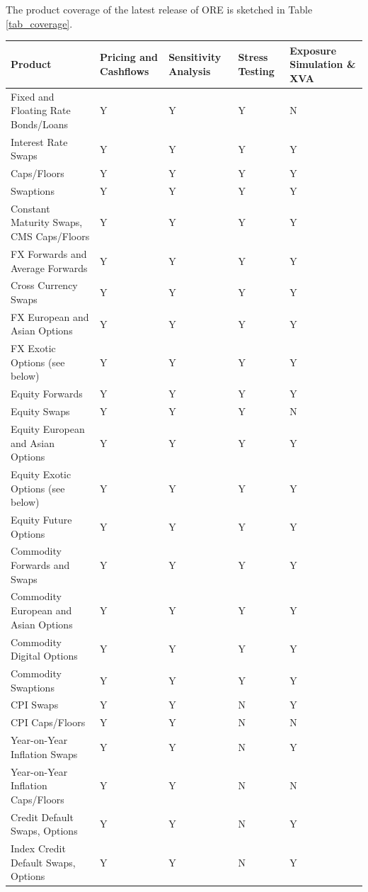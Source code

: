 \documentclass[12pt, a4paper]{article}
\begin{document}
\medskip 
The product coverage of the latest release of ORE is sketched in Table \ref{tab_coverage}.
\begin{table}[hbt]
\scriptsize
\begin{center}
\begin{tabular}{|l|p{1.5cm}|p{1.5cm}|p{1.2cm}|p{1.5cm}|}
\hline
Product & Pricing and Cashflows & Sensitivity Analysis & Stress Testing & Exposure Simulation \& XVA\\
\hline
Fixed and Floating Rate Bonds/Loans & Y & Y & Y & N \\
\hline
Interest Rate Swaps & Y & Y & Y & Y\\
\hline
Caps/Floors & Y & Y & Y & Y\\
\hline
Swaptions & Y & Y & Y &Y \\
\hline
Constant Maturity Swaps, CMS Caps/Floors & Y & Y & Y & Y\\
\hline
FX Forwards and Average Forwards & Y & Y & Y & Y \\
\hline
Cross Currency Swaps & Y & Y & Y & Y \\
\hline
FX European and Asian Options & Y & Y & Y & Y\\
\hline
FX Exotic Options (see below) & Y & Y & Y & Y\\
\hline
Equity Forwards & Y & Y & Y & Y\\
\hline
Equity Swaps & Y & Y & Y & N\\
\hline
Equity European and Asian Options & Y & Y & Y & Y \\
\hline
Equity Exotic Options (see below)  & Y & Y & Y & Y \\
\hline
Equity Future Options & Y & Y & Y & Y \\
\hline
Commodity Forwards and Swaps & Y & Y & Y & Y\\
\hline
Commodity European and Asian Options & Y & Y & Y & Y \\
\hline
Commodity Digital Options & Y & Y & Y & Y \\
\hline
Commodity Swaptions & Y & Y & Y & Y\\
\hline
CPI Swaps & Y & Y & N & Y \\
\hline
CPI Caps/Floors & Y & Y & N & N\\
\hline
Year-on-Year Inflation Swaps & Y & Y & N & Y \\
\hline
Year-on-Year Inflation Caps/Floors & Y & Y & N & N\\
\hline
Credit Default Swaps, Options & Y & Y & N & Y \\
\hline
Index Credit Default Swaps, Options & Y & Y & N & Y \\

\end{tabular}
\end{center}
\end{table}
\end{document}
